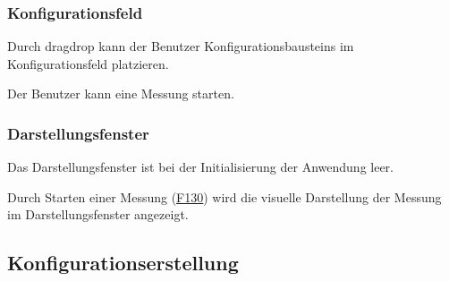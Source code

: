\documentclass[parskip=full]{scrartcl}
\begin{document}
\subsubsection{Konfigurationsfeld}

\begin{description}
\hypertarget{link-f120}{\item[F120]} Durch \gls{dragdrop} kann der Benutzer \glspl{Konfigurationsbaustein} im Konfigurationsfeld platzieren.
\hypertarget{link-f130}{\item[F130]} Der Benutzer kann eine Messung starten.
\end{description}


\subsubsection{Darstellungsfenster}

\begin{description}
\hypertarget{link-f140}{\item[F140]} Das Darstellungsfenster ist bei der Initialisierung der Anwendung leer.
\hypertarget{link-f150}{\item[F150]} Durch Starten einer Messung (\hyperlink{link-f130}{F130}) wird die visuelle Darstellung der Messung im Darstellungsfenster angezeigt.
\end{description}



\subsection{Konfigurationserstellung}
\end{document}
